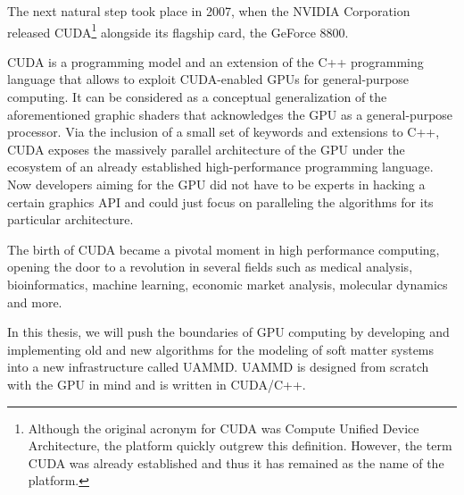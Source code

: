 \documentclass[ twoside,openright,titlepage,numbers=noenddot,%
headinclude,footinclude,cleardoublepage=empty,abstract=on,
BCOR=5mm,paper=b5,fontsize=11pt, dvipsnames
]{scrreprt}
\newcommand{\uammd}{\gls{UAMMD}\xspace}
\newcommand{\gpu}{\gls{GPU}\xspace}
\begin{document}
The next natural step took place in 2007, when the NVIDIA Corporation released CUDA\cite{cuda}\footnote{Although the original acronym for CUDA was Compute Unified Device Architecture, the platform quickly outgrew this definition. However, the term CUDA was already established and thus it has remained as the name of the platform.} alongside its flagship card, the GeForce 8800.

CUDA is a programming model and an extension of the C++ programming language that allows to exploit CUDA-enabled \glspl{GPU} for general-purpose computing. It can be considered as a conceptual generalization of the aforementioned graphic shaders that acknowledges the \gpu as a general-purpose processor. Via the inclusion of a small set of keywords and extensions to C++, CUDA exposes the massively parallel architecture of the \gpu under the ecosystem of an already established high-performance programming language.
Now developers aiming for the \gpu did not have to be experts in hacking a certain graphics \gls{API} and could just focus on paralleling the algorithms for its particular architecture.

The birth of CUDA became a pivotal moment in high performance computing, opening the door to a revolution in several fields such as medical analysis, bioinformatics, machine learning, economic market analysis, molecular dynamics and more.

In this thesis, we will push the boundaries of \gpu computing by developing and implementing old and new algorithms for the modeling of soft matter systems into a new infrastructure called \uammd. \uammd is designed from scratch with the \gpu in mind and is written in CUDA/C++.
\end{document}
